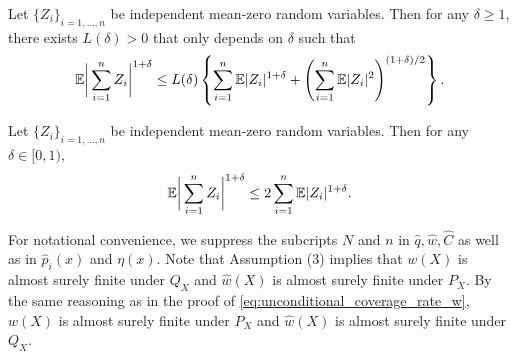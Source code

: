 \begin{proposition}\label{prop:rosenthal}
  Let $\{Z_{i}\}_{i = 1, \ldots, n}$ be independent mean-zero random
  variables. Then for any $\delta \ge 1$, there exists $L(\delta) > 0$
  that only depends on $\delta$ such that
\[\mathbb{E} \bigg|\sum_{i=1}^{n}Z_{i}\bigg|^{1 + \delta}\le L(\delta)\left\{\sum_{i=1}^{n}\mathbb{E} |Z_{i}|^{1 + \delta} + \left(\sum_{i=1}^{n}\mathbb{E} |Z_{i}|^{2}\right)^{(1 + \delta) / 2}\right\}.\]
\end{proposition}

\begin{proposition}\label{prop:vonbahresseen}
 Let $\{Z_{i}\}_{i = 1, \ldots, n}$ be independent mean-zero random variables. Then for any $\delta \in [0, 1)$,
\[\mathbb{E} \bigg|\sum_{i=1}^{n}Z_{i}\bigg|^{1 + \delta}\le 2\sum_{i=1}^{n}\mathbb{E} |Z_{i}|^{1 + \delta}.\]
\end{proposition}


For notational convenience, we suppress the subcripts $N$ and $n$ in $\hat{q}, \hat{w}, \hat{C}$ as well as in $\hat{p}_{i}(x)$ and $\eta(x)$. Note that Assumption (3) implies that $w(X)$ is almost surely finite under $Q_{X}$ and $\hat{w}(X)$ is almost surely finite under $P_{X}$. By the same reasoning as in the proof of \eqref{eq:unconditional_coverage_rate_w}, $w(X)$ is almost surely finite under $P_{X}$ and $\hat{w}(X)$ is almost surely finite under $Q_{X}$. 


